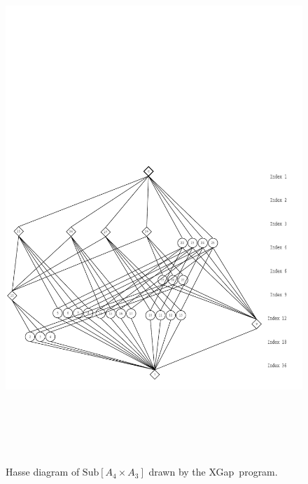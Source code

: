 \documentclass[11pt]{amsart}
\newcommand{\xgap}{XGap}   %
\theoremstyle{plain}
\newcommand{\<}{\ensuremath{\langle}}
\renewcommand{\>}{\ensuremath{\rangle}}
\newcommand{\Sub}{\ensuremath{\mathrm{Sub}}}
\begin{document}
\begin{enumerate}
{\begin{verbatim}
\end{verbatim}}
\begin{figure}[h!]\begin{center}
\vspace{-8cm}
\includegraphics[height=20cm]{a4a3new.pdf}%
\caption{Hasse diagram of $\Sub[A_4 \times A_3]$ drawn by the \xgap\ program.}
\label{fig:a4a3}
\end{center}\end{figure}
\begin{figure}[h!]\begin{center}
\vspace{-8cm}

\end{center}
\end{figure}
\end{enumerate}
\end{document}
